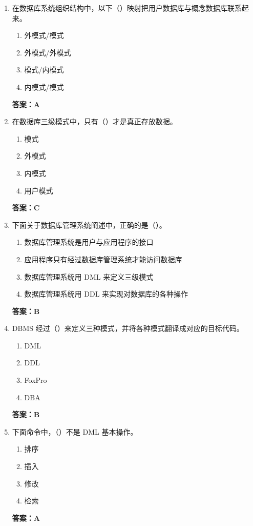 \documentclass[12pt, a4paper]{article}
\begin{document}
\begin{enumerate}[label=\arabic*.]
	\item 在数据库系统组织结构中，以下（\quad）映射把用户数据库与概念数据库联系起来。
	      \begin{enumerate}
		      \item 外模式/模式
		      \item 外模式/外模式
		      \item 模式/内模式
		      \item 内模式/模式
	      \end{enumerate}
	      \textbf{答案：A}

	\item 在数据库三级模式中，只有（\quad）才是真正存放数据。
	      \begin{enumerate}
		      \item 模式
		      \item 外模式
		      \item 内模式
		      \item 用户模式
	      \end{enumerate}
	      \textbf{答案：C}

	\item 下面关于数据库管理系统阐述中，正确的是（\quad）。
	      \begin{enumerate}
		      \item 数据库管理系统是用户与应用程序的接口
		      \item 应用程序只有经过数据库管理系统才能访问数据库
		      \item 数据库管理系统用 DML 来定义三级模式
		      \item 数据库管理系统用 DDL 来实现对数据库的各种操作
	      \end{enumerate}
	      \textbf{答案：B}

	\item DBMS 经过（\quad）来定义三种模式，并将各种模式翻译成对应的目标代码。
	      \begin{enumerate}
		      \item DML
		      \item DDL
		      \item FoxPro
		      \item DBA
	      \end{enumerate}
	      \textbf{答案：B}

	\item 下面命令中，（\quad）不是 DML 基本操作。
	      \begin{enumerate}
		      \item 排序
		      \item 插入
		      \item 修改
		      \item 检索
	      \end{enumerate}
	      \textbf{答案：A}


\end{enumerate}
\end{document}
